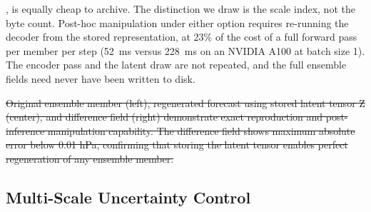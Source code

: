 \documentclass{agujournal2019}
\providecommand{\DIFdel}[1]{{\protect\color{red}\sout{#1}}}                      %
\providecommand{\DIFaddend}{} %
\providecommand{\DIFdelbegin}{} %
\providecommand{\DIFdelend}{} %
\providecommand{\DIFdelFL}[1]{\DIFdel{#1}} %
\begin{document}
{{\cite{alet2024fgn}}\hskip0pt%
, is equally cheap to archive. The distinction we draw is the scale index, not the byte count. Post-hoc manipulation under either option requires re-running the decoder from the stored representation, at 23\% of the cost of a full forward pass per member per step (52~ms versus 228~ms on an NVIDIA A100 at batch size 1). The encoder pass and the latent draw are not repeated, and the full ensemble fields need never have been written to disk.
}\DIFaddend 


\DIFdelbegin %
{%
\DIFdelFL{Original ensemble member (left), regenerated forecast using stored latent tensor Z (center), and difference field (right) demonstrate exact reproduction and post-inference manipulation capability. The difference field shows maximum
absolute error below 0.01 hPa, confirming that storing the latent tensor enables perfect regeneration of any ensemble member.}}

\DIFdelend \subsection{Multi-Scale Uncertainty Control}
\label{sec:multi_scale_control}

\end{document}
